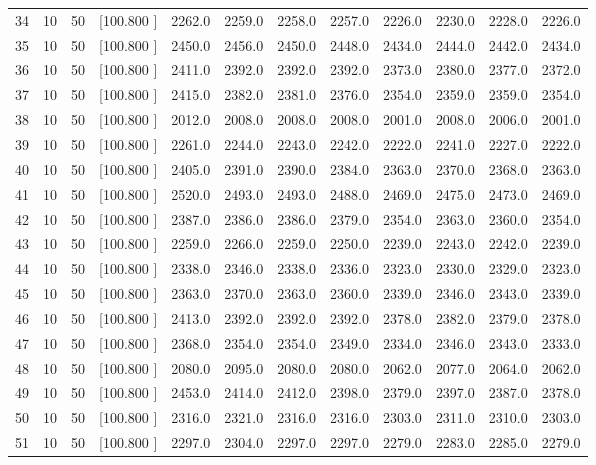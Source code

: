 \documentclass[12pt,a4paper]{article}
\begin{document}
\begin{center}
{\begin{tabular}{r r r r r r r r r r r r}
  34& 10& 50&[100.800   ]&  2262.0&  2259.0&  2258.0&  2257.0&  2226.0&  2230.0&  2228.0&  2226.0\\[-0.02in]
  35& 10& 50&[100.800   ]&  2450.0&  2456.0&  2450.0&  2448.0&  2434.0&  2444.0&  2442.0&  2434.0\\[-0.02in]
  36& 10& 50&[100.800   ]&  2411.0&  2392.0&  2392.0&  2392.0&  2373.0&  2380.0&  2377.0&  2372.0\\[-0.02in]
  37& 10& 50&[100.800   ]&  2415.0&  2382.0&  2381.0&  2376.0&  2354.0&  2359.0&  2359.0&  2354.0\\[-0.02in]
  38& 10& 50&[100.800   ]&  2012.0&  2008.0&  2008.0&  2008.0&  2001.0&  2008.0&  2006.0&  2001.0\\[-0.02in]
  39& 10& 50&[100.800   ]&  2261.0&  2244.0&  2243.0&  2242.0&  2222.0&  2241.0&  2227.0&  2222.0\\[-0.02in]
  40& 10& 50&[100.800   ]&  2405.0&  2391.0&  2390.0&  2384.0&  2363.0&  2370.0&  2368.0&  2363.0\\[-0.02in]
  41& 10& 50&[100.800   ]&  2520.0&  2493.0&  2493.0&  2488.0&  2469.0&  2475.0&  2473.0&  2469.0\\[-0.02in]
  42& 10& 50&[100.800   ]&  2387.0&  2386.0&  2386.0&  2379.0&  2354.0&  2363.0&  2360.0&  2354.0\\[-0.02in]
  43& 10& 50&[100.800   ]&  2259.0&  2266.0&  2259.0&  2250.0&  2239.0&  2243.0&  2242.0&  2239.0\\[-0.02in]
  44& 10& 50&[100.800   ]&  2338.0&  2346.0&  2338.0&  2336.0&  2323.0&  2330.0&  2329.0&  2323.0\\[-0.02in]
  45& 10& 50&[100.800   ]&  2363.0&  2370.0&  2363.0&  2360.0&  2339.0&  2346.0&  2343.0&  2339.0\\[-0.02in]
  46& 10& 50&[100.800   ]&  2413.0&  2392.0&  2392.0&  2392.0&  2378.0&  2382.0&  2379.0&  2378.0\\[-0.02in]
  47& 10& 50&[100.800   ]&  2368.0&  2354.0&  2354.0&  2349.0&  2334.0&  2346.0&  2343.0&  2333.0\\[-0.02in]
  48& 10& 50&[100.800   ]&  2080.0&  2095.0&  2080.0&  2080.0&  2062.0&  2077.0&  2064.0&  2062.0\\[-0.02in]
  49& 10& 50&[100.800   ]&  2453.0&  2414.0&  2412.0&  2398.0&  2379.0&  2397.0&  2387.0&  2378.0\\[-0.02in]
  50& 10& 50&[100.800   ]&  2316.0&  2321.0&  2316.0&  2316.0&  2303.0&  2311.0&  2310.0&  2303.0\\[-0.02in]
  51& 10& 50&[100.800   ]&  2297.0&  2304.0&  2297.0&  2297.0&  2279.0&  2283.0&  2285.0&  2279.0\\[-0.02in]

\end{tabular}}
\end{center}
\end{document}
